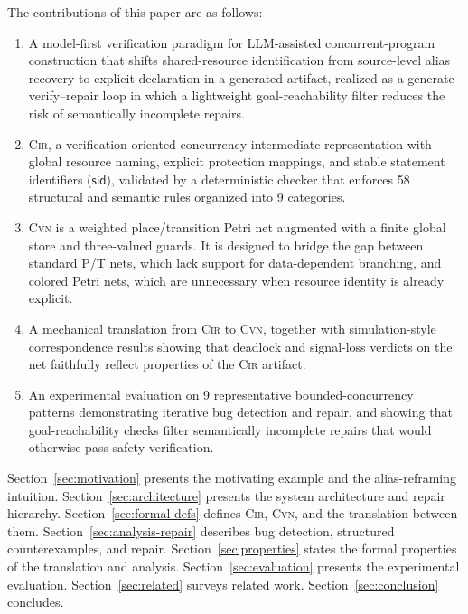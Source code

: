 The contributions of this paper are as follows:
\begin{enumerate}[leftmargin=*]

\item A model-first verification paradigm for LLM-assisted
  concurrent-program construction that shifts shared-resource
  identification from source-level alias recovery to explicit
  declaration in a generated artifact, realized as a
  generate--verify--repair loop in which a lightweight
  goal-reachability filter reduces the risk of semantically
  incomplete repairs.

\item \textsc{Cir}, a verification-oriented concurrency
  intermediate representation with global resource naming,
  explicit protection mappings, and stable statement identifiers
  ($\mathsf{sid}$), validated by a deterministic checker that
  enforces 58 structural and semantic rules organized into 9
  categories.

\item \textsc{Cvn} is a weighted place/transition Petri net augmented with a finite global store and three-valued guards. It is designed to bridge the gap between standard P/T nets, which lack support for data-dependent branching, and colored Petri nets, which are unnecessary when resource identity is already explicit.

\item A mechanical translation from \textsc{Cir} to
  \textsc{Cvn}, together with simulation-style correspondence
  results showing that deadlock and signal-loss verdicts on the
  net faithfully reflect properties of the \textsc{Cir} artifact.

\item An experimental evaluation on 9 representative
  bounded-concurrency patterns demonstrating iterative bug
  detection and repair, and showing that goal-reachability checks
  filter semantically incomplete repairs that would otherwise pass safety verification.

\end{enumerate}

Section~\ref{sec:motivation} presents the motivating example and the alias-reframing intuition.
Section~\ref{sec:architecture} presents the system architecture and repair hierarchy.
Section~\ref{sec:formal-defs} defines \textsc{Cir}, \textsc{Cvn}, and the translation between them.
Section~\ref{sec:analysis-repair} describes bug detection, structured counterexamples, and repair.
Section~\ref{sec:properties} states the formal properties of the translation and analysis.
Section~\ref{sec:evaluation} presents the experimental evaluation.
Section~\ref{sec:related} surveys related work.
Section~\ref{sec:conclusion} concludes.
